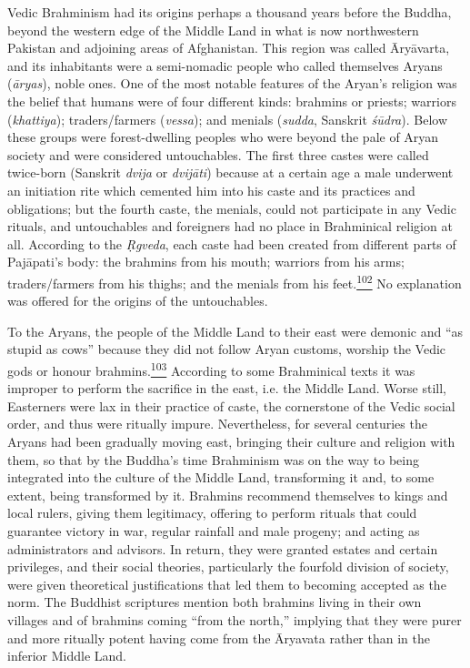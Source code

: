 Vedic Brahminism had its origins perhaps a thousand years before the
Buddha, beyond the western edge of the Middle Land in what is now
northwestern Pakistan and adjoining areas of Afghanistan. This region
was called Āryāvarta, and its inhabitants were a semi-nomadic people who
called themselves Aryans (\emph{āryas}), noble ones. One of the most
notable features of the Aryan's religion was the belief that humans were
of four different kinds: brahmins or priests; warriors
(\emph{khattiya}); traders/farmers (\emph{vessa}); and menials
(\emph{sudda}, Sanskrit \emph{śūdra}). Below these groups were
forest-dwelling peoples who were beyond the pale of Aryan society and
were considered untouchables. The first three castes were called
twice-born (Sanskrit \emph{dvija} or \emph{dvijāti}) because at a
certain age a male underwent an initiation rite which cemented him into
his caste and its practices and obligations; but the fourth caste, the
menials, could not participate in any Vedic rituals, and untouchables
and foreigners had no place in Brahminical religion at all. According to
the \emph{Ṛgveda}, each caste had been created from different parts of
Pajāpati's body: the brahmins from his mouth; warriors from his arms;
traders/farmers from his thighs; and the menials from his
feet.\label{footprints_split_007.html_fnref102}\hyperref[footprints_split_024.htmlux5cux23fn102]{\textsuperscript{102}}
No explanation was offered for the origins of the untouchables.

To the Aryans, the people of the Middle Land to their east were demonic
and ``as stupid as cows'' because they did not follow Aryan customs,
worship the Vedic gods or honour
brahmins.\label{footprints_split_007.html_fnref103}\hyperref[footprints_split_024.htmlux5cux23fn103]{\textsuperscript{103}}
According to some Brahminical texts it was improper to perform the
sacrifice in the east, i.e. the Middle Land. Worse still, Easterners
were lax in their practice of caste, the cornerstone of the Vedic social
order, and thus were ritually impure. Nevertheless, for several
centuries the Aryans had been gradually moving east, bringing their
culture and religion with them, so that by the Buddha's time Brahminism
was on the way to being integrated into the culture of the Middle Land,
transforming it and, to some extent, being transformed by it. Brahmins
recommend themselves to kings and local rulers, giving them legitimacy,
offering to perform rituals that could guarantee victory in war, regular
rainfall and male progeny; and acting as administrators and advisors. In
return, they were granted estates and certain privileges, and their
social theories, particularly the fourfold division of society, were
given theoretical justifications that led them to becoming accepted as
the norm. The Buddhist scriptures mention both brahmins living in their
own villages and of brahmins coming ``from the north,'' implying that
they were purer and more ritually potent having come from the Āryavata
rather than in the inferior Middle Land.

